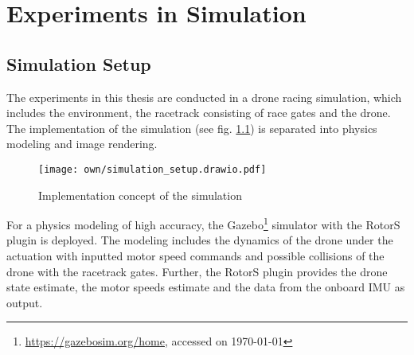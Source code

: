 \chapter{Experiments in Simulation}
\label{maintwo}

\section{Simulation Setup} \label{sec:sim_setup}
The experiments in this thesis 
are conducted in a drone racing simulation,
which includes the environment, 
the racetrack consisting of race gates 
and the drone.
The implementation of the simulation (see fig. \ref{fig:simulation_setup})
is separated into physics modeling and image rendering.
\begin{figure}%
    \centering
    \texttt{[image: own/simulation\_setup.drawio.pdf]}
    \caption[
        Implementation concept of the simulation
    ]{
        Implementation concept of the simulation
    \label{fig:simulation_setup}
    }
\end{figure}

For a physics modeling of high accuracy,
the Gazebo\footnote{\url{https://gazebosim.org/home}, accessed on \today} 
simulator
with the RotorS \cite{Furrer2016} plugin is deployed.
The modeling includes the dynamics of the drone under 
the actuation with inputted motor speed commands
and possible collisions of the drone with the racetrack gates.
Further, the RotorS plugin provides the
drone state estimate, the motor speeds estimate and the
data from the onboard IMU as output.


